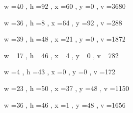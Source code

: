\documentclass[11pt]{article}
\begin{document}
w =40 , h =92 , x =60 , y =0 , v =3680
\par
w =36 , h =8 , x =64 , y =92 , v =288
\par
w =39 , h =48 , x =21 , y =0 , v =1872
\par
w =17 , h =46 , x =4 , y =0 , v =782
\par
w =4 , h =43 , x =0 , y =0 , v =172
\par
w =23 , h =50 , x =37 , y =48 , v =1150
\par
w =36 , h =46 , x =1 , y =48 , v =1656
\par
\newpage
\end{document}
